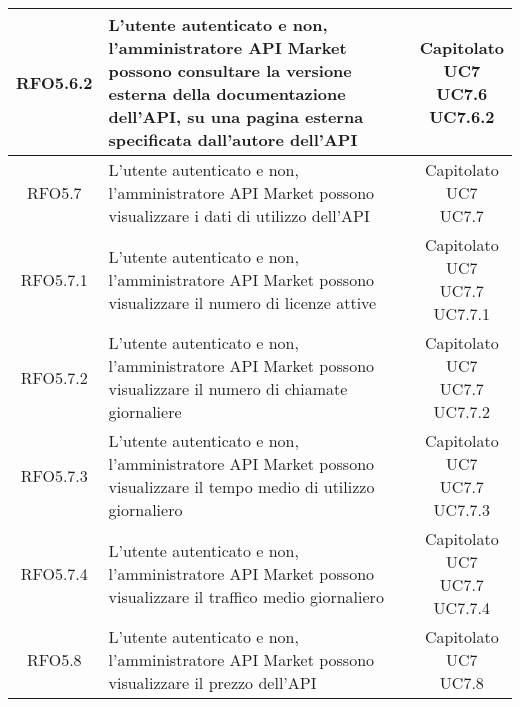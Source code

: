 \begin{longtable}{|c|p{8cm}|c|}
\hypertarget{RFO5.6.2}{RFO5.6.2} &  L'utente autenticato e non, l'amministratore API Market possono consultare la versione esterna della documentazione dell'API, su una pagina esterna specificata dall'autore dell'API  & \makecell*{Capitolato\\UC7\\UC7.6\\UC7.6.2} \\
\hline

\hypertarget{RFO5.7}{RFO5.7} & L'utente autenticato e non, l'amministratore API Market possono visualizzare i dati di utilizzo dell'API & \makecell*{Capitolato\\UC7\\UC7.7} \\
\hline

\hypertarget{RFO5.7.1}{RFO5.7.1} &  L'utente autenticato e non, l'amministratore API Market possono visualizzare il numero di licenze attive & \makecell*{Capitolato\\UC7\\UC7.7\\UC7.7.1} \\
\hline

\hypertarget{RFO5.7.2}{RFO5.7.2} &  L'utente autenticato e non, l'amministratore API Market possono visualizzare il numero di chiamate giornaliere & \makecell*{Capitolato\\UC7\\UC7.7\\UC7.7.2} \\
\hline
\hypertarget{RFO5.7.3}{RFO5.7.3} &  L'utente autenticato e non, l'amministratore API Market possono visualizzare il tempo medio di utilizzo giornaliero & \makecell*{Capitolato\\UC7\\UC7.7\\UC7.7.3} \\
\hline
\hypertarget{RFO5.7.4}{RFO5.7.4} &  L'utente autenticato e non, l'amministratore API Market possono visualizzare il traffico medio giornaliero & \makecell*{Capitolato\\UC7\\UC7.7\\UC7.7.4} \\
\hline

\hypertarget{RFO5.8}{RFO5.8} & L'utente autenticato e non, l'amministratore API Market possono visualizzare il prezzo dell'API & \makecell*{Capitolato\\UC7\\UC7.8} \\
\hline


\end{longtable}

